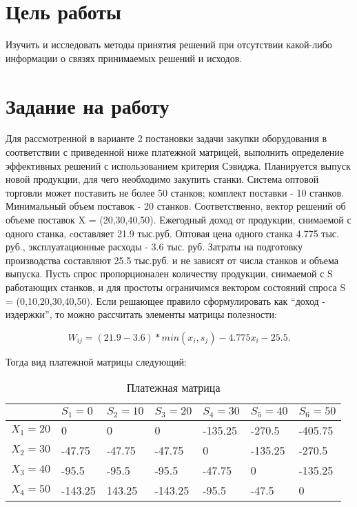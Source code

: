 \documentclass[a4paper,14pt]{extarticle}
\begin{document}


\section{Цель работы}
Изучить и исследовать методы принятия решений при отсутствии какой-либо
информации о связях принимаемых решений и исходов.

\section{Задание на работу}
Для рассмотренной в варианте 2 постановки задачи закупки оборудования в
соответствии с приведенной ниже платежной матрицей, выполнить определение
эффективных решений  с использованием критерия Сэвиджа. Планируется выпуск
новой продукции, для чего необходимо закупить станки. Система оптовой торговли
может поставить не более 50 станков; комплект поставки - 10 станков. Минимальный
объем поставок - 20 станков. Соответственно, вектор решений об объеме поставок X
= (20,30,40,50). Ежегодный доход от продукции, снимаемой с одного станка,
cоставляет 21.9 тыс.руб. Оптовая цена одного станка 4.775 тыс. руб.,
эксплуатационные расходы - 3.6 тыс. руб. Затраты на подготовку производства
составляют 25.5 тыс.руб. и не зависят от числа станков и объема выпуска. Пусть
спрос пропорционален количеству продукции, снимаемой с S работающих станков, и
для простоты ограничимся вектором состояний спроса S = (0,10,20,30,40,50). Если
решающее правило сформулировать как \enquote{доход - издержки}, то можно рассчитать
элементы матрицы полезности: 

$$ W_{ij} = (21.9 - 3.6) * min (x_i, s_j) - 4.775x_i - 25.5 .$$

Тогда вид платежной матрицы следующий:

\begin{table}[H]
    \caption{Платежная матрица}
    \begin{tabular}{ | p{1.9cm} | p{1.9cm} | p{1.9cm} | p{1.9cm} | p{1.9cm} | p{1.9cm} | p{1.9cm} | }
        \hline
         & $S_1=0$ & $S_2=10$ & $S_3=20$ & $S_4=30$ & $S_5=40$ & $S_6=50$ \\ \hline
        $X_1=20$ & 0 & 0 & 0 & -135.25 & -270.5 & -405.75 \\ \hline
        $X_2=30$ & -47.75 & -47.75 & -47.75 & 0 & -135.25 & -270.5 \\ \hline
        $X_3=40$ & -95.5 & -95.5 & -95.5 & -47.75 & 0 & -135.25 \\ \hline
        $X_4=50$ & -143.25 & 143.25 & -143.25 & -95.5 & -47.5 & 0 \\ \hline
    \end{tabular}
\end{table}
\end{document}

